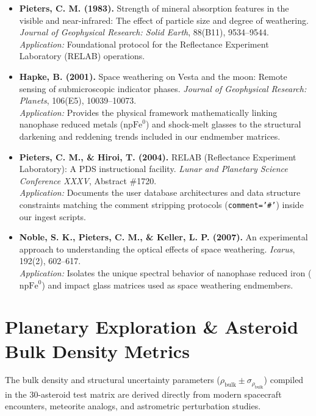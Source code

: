 \documentclass[11pt,letterpaper]{article}
\begin{document}
\begin{itemize}
    \item \textbf{Pieters, C. M. (1983).} Strength of mineral absorption features in the visible and near-infrared: The effect of particle size and degree of weathering. \textit{Journal of Geophysical Research: Solid Earth}, 88(B11), 9534--9544. \\
    \textit{Application:} Foundational protocol for the Reflectance Experiment Laboratory (RELAB) operations.
    
    \item \textbf{Hapke, B. (2001).} Space weathering on Vesta and the moon: Remote sensing of submicroscopic indicator phases. \textit{Journal of Geophysical Research: Planets}, 106(E5), 10039--10073. \\
    \textit{Application:} Provides the physical framework mathematically linking nanophase reduced metals ($\text{npFe}^0$) and shock-melt glasses to the structural darkening and reddening trends included in our endmember matrices.
    
    \item \textbf{Pieters, C. M., \& Hiroi, T. (2004).} RELAB (Reflectance Experiment Laboratory): A PDS instructional facility. \textit{Lunar and Planetary Science Conference XXXV}, Abstract \#1720. \\
    \textit{Application:} Documents the user database architectures and data structure constraints matching the comment stripping protocols (\texttt{comment='\#'}) inside our ingest scripts.
    
    \item \textbf{Noble, S. K., Pieters, C. M., \& Keller, L. P. (2007).} An experimental approach to understanding the optical effects of space weathering. \textit{Icarus}, 192(2), 602--617. \\
    \textit{Application:} Isolates the unique spectral behavior of nanophase reduced iron ($\text{npFe}^0$) and impact glass matrices used as space weathering endmembers.
\end{itemize}

\section{Planetary Exploration \& Asteroid Bulk Density Metrics}
The bulk density and structural uncertainty parameters ($\rho_{\text{bulk}} \pm \sigma_{\rho_{\text{bulk}}}$) compiled in the 30-asteroid test matrix are derived directly from modern spacecraft encounters, meteorite analogs, and astrometric perturbation studies.
\end{document}
